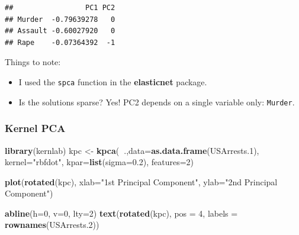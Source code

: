 \documentclass[]{book}
\newenvironment{Shaded}{\begin{snugshade}}{\end{snugshade}}
\newcommand{\KeywordTok}[1]{\textcolor[rgb]{0.13,0.29,0.53}{\textbf{#1}}}
\newcommand{\DataTypeTok}[1]{\textcolor[rgb]{0.13,0.29,0.53}{#1}}
\newcommand{\DecValTok}[1]{\textcolor[rgb]{0.00,0.00,0.81}{#1}}
\newcommand{\FloatTok}[1]{\textcolor[rgb]{0.00,0.00,0.81}{#1}}
\newcommand{\StringTok}[1]{\textcolor[rgb]{0.31,0.60,0.02}{#1}}
\newcommand{\CommentTok}[1]{\textcolor[rgb]{0.56,0.35,0.01}{\textit{#1}}}
\newcommand{\OtherTok}[1]{\textcolor[rgb]{0.56,0.35,0.01}{#1}}
\newcommand{\OperatorTok}[1]{\textcolor[rgb]{0.81,0.36,0.00}{\textbf{#1}}}
\newcommand{\NormalTok}[1]{#1}
\providecommand{\tightlist}{%
  \setlength{\itemsep}{0pt}\setlength{\parskip}{0pt}}
\theoremstyle{definition}
\theoremstyle{definition}
\theoremstyle{definition}
\theoremstyle{remark}
\begin{document}
\begin{Shaded}
\end{Shaded}

\begin{verbatim}
##                 PC1 PC2
## Murder  -0.79639278   0
## Assault -0.60027920   0
## Rape    -0.07364392  -1
\end{verbatim}

Things to note:

\begin{itemize}
\tightlist
\item
  I used the \texttt{spca} function in the \textbf{elasticnet} package.
\item
  Is the solutions sparse? Yes! PC2 depends on a single variable only:
  \texttt{Murder}.
\end{itemize}

\subsubsection{Kernel PCA}\label{kernel-pca}

\begin{Shaded}
\begin{Highlighting}[]
\KeywordTok{library}\NormalTok{(kernlab)}
\NormalTok{kpc <-}\StringTok{ }\KeywordTok{kpca}\NormalTok{(}\OperatorTok{~}\NormalTok{.,}\DataTypeTok{data=}\KeywordTok{as.data.frame}\NormalTok{(USArrests.}\DecValTok{1}\NormalTok{), }\DataTypeTok{kernel=}\StringTok{"rbfdot"}\NormalTok{, }\DataTypeTok{kpar=}\KeywordTok{list}\NormalTok{(}\DataTypeTok{sigma=}\FloatTok{0.2}\NormalTok{), }\DataTypeTok{features=}\DecValTok{2}\NormalTok{)}

\KeywordTok{plot}\NormalTok{(}\KeywordTok{rotated}\NormalTok{(kpc),}
     \DataTypeTok{xlab=}\StringTok{"1st Principal Component"}\NormalTok{,}
     \DataTypeTok{ylab=}\StringTok{"2nd Principal Component"}\NormalTok{)}

\KeywordTok{abline}\NormalTok{(}\DataTypeTok{h=}\DecValTok{0}\NormalTok{, }\DataTypeTok{v=}\DecValTok{0}\NormalTok{, }\DataTypeTok{lty=}\DecValTok{2}\NormalTok{)}
\KeywordTok{text}\NormalTok{(}\KeywordTok{rotated}\NormalTok{(kpc), }\DataTypeTok{pos =} \DecValTok{4}\NormalTok{, }\DataTypeTok{labels =} \KeywordTok{rownames}\NormalTok{(USArrests.}\DecValTok{2}\NormalTok{))}
\end{Highlighting}
\end{Shaded}
\end{document}
